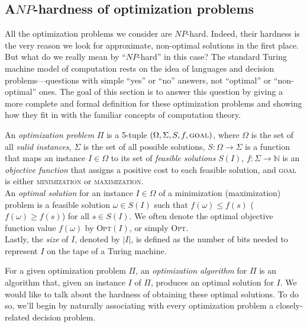 \documentclass{article}
\newcommand{\N}{\mathbb{N}}
\newenvironment{definition}[2][Definition]{\begin{trivlist}
\item[\hskip \labelsep {\bfseries #1}\hskip \labelsep {\hspace{-1ex}\bfseries #2.}]}{\end{trivlist}}
\begin{document}
\subsection*{A\hspace{12pt}$NP$-hardness of optimization problems}

All the optimization problems we consider are $NP$-hard. Indeed, their hardness is the very reason we look for approximate, non-optimal solutions in the first place. But what do we really mean by ``$NP$-hard'' in this case? The standard Turing machine model of computation rests on the idea of languages and decision problems---questions with simple ``yes'' or ``no'' answers, not ``optimal'' or ``non-optimal'' ones. The goal of this section is to answer this question by giving a more complete and formal definition for these optimization problems and showing how they fit in with the familiar concepts of computation theory.

\begin{definition}{ (Optimization Problem)}{}
    An \textit{optimization problem} $\Pi$ is a 5-tuple $(\Omega, \Sigma, S, f, \textsc{goal})$, where $\Omega$ is the set of all \textit{valid instances}, $\Sigma$ is the set of all possible solutions, $S: \Omega \to \Sigma$ is a function that maps an instance $I \in \Omega$ to its set of \textit{feasible solutions} $S(I)$, $f: \Sigma \to \N$ is an \textit{objective function} that assigns a positive cost to each feasible solution, and \textsc{goal} is either \textsc{minimization} or \textsc{maximization}.\vspace{4pt}\\
    \noindent An \textit{optimal solution} for an instance $I \in \Omega$ of a minimization (maximization) problem is a feasible solution $\omega \in S(I)$ such that $f(\omega) \leq f(s)$ ($f(\omega) \geq f(s)$) for all $s \in S(I)$. We often denote the optimal objective function value $f(\omega)$ by \textsc{Opt}$(I)$, or simply \textsc{Opt}.\vspace{4pt}\\
    \noindent Lastly, the \textit{size} of $I$, denoted by $|I|$, is defined as the number of bits needed to represent $I$ on the tape of a Turing machine.
\end{definition}

\noindent For a given optimization problem $\Pi$, an \textit{optimization algorithm} for $\Pi$ is an algorithm that, given an instance $I$ of $\Pi$, produces an optimal solution for $I$. We would like to talk about the hardness of obtaining these optimal solutions. To do so, we'll begin by naturally associating with every optimization problem a closely-related decision problem.
\end{document}
